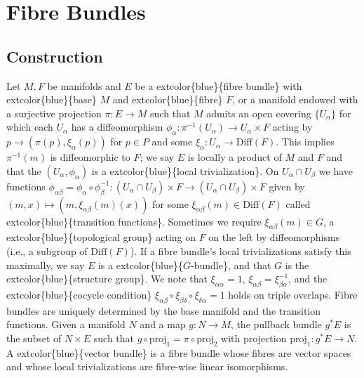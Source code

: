 \documentclass[
]{book}
\begin{document}
\hypertarget{fibre-bundles}{%
\chapter{Fibre Bundles}\label{fibre-bundles}}

\hypertarget{construction-1}{%
\section{Construction}\label{construction-1}}

Let \(M, F\) be manifolds and \(E\) be a extcolor\{blue\}\{fibre bundle\} with extcolor\{blue\}\{base\} \(M\) and extcolor\{blue\}\{fibre\} \(F\), or a manifold endowed with a surjective projection \(\pi : E \to M\) such that \(M\) admits an open covering \(\{U_\alpha\}\) for which each \(U_\alpha\) has a diffeomorphism \(\phi_\alpha : \pi^{-1}(U_\alpha) \to U_\alpha \times F\) acting by \(p \to (\pi(p), \xi_\alpha(p))\) for \(p \in P\) and some \(\xi_\alpha : U_\alpha \to \text{Diff}(F)\). This implies \(\pi^{-1}(m)\) is diffeomorphic to \(F\); we say \(E\) is locally a product of \(M\) and \(F\) and that the \((U_\alpha, \phi_\alpha)\) is a extcolor\{blue\}\{local trivialization\}. On \(U_\alpha \cap U_\beta\) we have functions \(\phi_{\alpha\beta} = \phi_\alpha \circ \phi_\beta^{-1} : (U_\alpha \cap U_\beta) \times F \to (U_\alpha \cap U_\beta) \times F\) given by \((m, x) \mapsto (m, \xi_{\alpha\beta}(m)(x))\) for some \(\xi_{\alpha\beta}(m) \in \text{Diff}(F)\) called extcolor\{blue\}\{transition functions\}. Sometimes we require \(\xi_{\alpha\beta}(m) \in G\), a extcolor\{blue\}\{topological group\} acting on \(F\) on the left by diffeomorphisms (i.e., a subgroup of \(\text{Diff}(F)\)). If a fibre bundle's local trivializations satisfy this maximally, we say \(E\) is a extcolor\{blue\}\{\(G\)-bundle\}, and that \(G\) is the extcolor\{blue\}\{structure group\}. We note that \(\xi_{\alpha\alpha} = 1\), \(\xi_{\alpha\beta} = \xi_{\beta\alpha}^{-1}\), and the extcolor\{blue\}\{cocycle condition\} \(\xi_{\alpha\beta} \circ \xi_{\beta\delta} \circ \xi_{\delta\alpha} = 1\) holds on triple overlaps. Fibre bundles are uniquely determined by the base manifold and the transition functions. Given a manifold \(N\) and a map \(g : N \to M\), the pullback bundle \(g^*E\) is the subset of \(N \times E\) such that \(g \circ \text{proj}_{1} = \pi \circ \text{proj}_{2}\) with projection \(\text{proj}_{1} : g^*E \to N\). A extcolor\{blue\}\{vector bundle\} is a fibre bundle whose fibres are vector spaces and whose local trivializations are fibre-wise linear isomorphisms.
\end{document}
